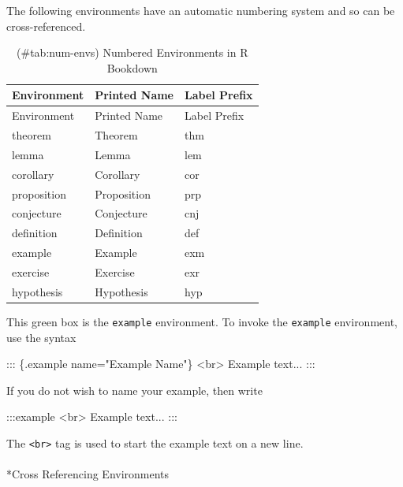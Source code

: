 \documentclass[
  letterpaper,
]{article}
\makeatletter
\let\oldparagraph\paragraph
\renewcommand{\paragraph}{
    \@ifstar
      \xxxParagraphStar
      \xxxParagraphNoStar
  }
\newcommand{\xxxParagraphStar}[1]{\oldparagraph*{#1}\mbox{}}
\newcommand{\xxxParagraphNoStar}[1]{\oldparagraph{#1}\mbox{}}
\newenvironment{Shaded}{\begin{snugshade}}{\end{snugshade}}
\newcommand{\NormalTok}[1]{\textcolor[rgb]{0.00,0.23,0.31}{#1}}
\numberwithin{equation}{section}
\numberwithin{figure}{section}
\theoremstyle{break}
\makeatother
\begin{document}
The following environments have an automatic numbering system and so can
be cross-referenced.

\begin{longtable}[]{@{}lll@{}}
\caption{(\#tab:num-envs) Numbered Environments in R
Bookdown}\tabularnewline
\toprule\noalign{}
Environment & Printed Name & Label Prefix \\
\midrule\noalign{}
\endfirsthead
\toprule\noalign{}
Environment & Printed Name & Label Prefix \\
\midrule\noalign{}
\endhead
\bottomrule\noalign{}
\endlastfoot
theorem & Theorem & thm \\
lemma & Lemma & lem \\
corollary & Corollary & cor \\
proposition & Proposition & prp \\
conjecture & Conjecture & cnj \\
definition & Definition & def \\
example & Example & exm \\
exercise & Exercise & exr \\
hypothesis & Hypothesis & hyp \\
\end{longtable}

This green box is the \texttt{example} environment. To invoke the
\texttt{example} environment, use the syntax

\begin{Shaded}
\begin{Highlighting}[]
\NormalTok{::: \{.example name="Example Name"\}}
\NormalTok{\textless{}br\textgreater{}}
\NormalTok{Example text...}
\NormalTok{:::}
\end{Highlighting}
\end{Shaded}

If you do not wish to name your example, then write

\begin{Shaded}
\begin{Highlighting}[]
\NormalTok{:::example}
\NormalTok{\textless{}br\textgreater{}}
\NormalTok{Example text...}
\NormalTok{:::}
\end{Highlighting}
\end{Shaded}

The \texttt{\textless{}br\textgreater{}} tag is used to start the
example text on a new line.

\paragraph*{Cross Referencing
Environments}\label{cross-referencing-environments}
\end{document}
